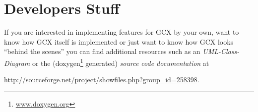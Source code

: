 \section{Developers Stuff}
If you are interested in implementing features for GCX by your own, want to know how GCX itself is implemented or just want to know how GCX looks \enquote{behind the scenes} you can find additional resources such as an \emph{UML-Class-Diagram} or the (doxygen\footnote{\href{www.doxygen.org}{www.doxygen.org}} generated) \emph{source code documentation} at
\begin{center}
\href{http://sourceforge.net/project/showfiles.php?group_id=258398}{http://sourceforge.net/project/showfiles.php?group\_id=258398}.
\end{center} 

